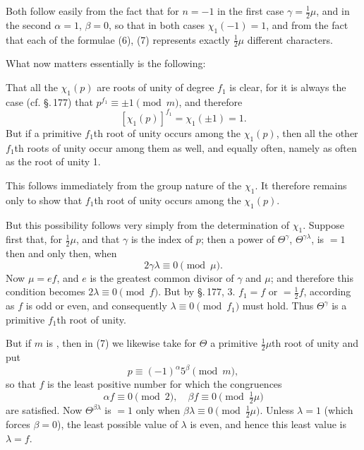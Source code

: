 Both follow easily from the fact that for $n = -1$ in the first
case $\gamma = \tfrac12\mu$, and in the second $\alpha=1$,
$\beta=0$, so that in both cases $\chi_1(-1)=1$, and from the fact
that each of the formulae (6), (7) represents exactly
$\tfrac12\mu$ different characters.

What now matters essentially is the following:

\begin{quote}
\end{quote}

That all the $\chi_1(p)$ are roots of unity of degree $f_1$ is
clear, for it is always the case (cf. \S.\,177) that
$p^{f_1}\equiv\pm1\pmod{m}$, and therefore
\[ [\chi_1(p)]^{f_1} = \chi_1(\pm1) = 1. \]
But if a primitive $f_1$th root of unity occurs among the
$\chi_1(p)$, then all the other $f_1$th roots of unity occur among
them as well, and equally often, namely as often as the root of
unity 1.

This follows immediately from the group nature of the $\chi_1$. It
therefore remains only to show that  $f_1$th root of
unity occurs among the $\chi_1(p)$.

But this possibility follows very simply from the determination of
$\chi_1$. Suppose first that, for  $\tfrac12\mu$, and that $\gamma$
is the index of $p$; then a power of $\Theta^{\gamma}$,
$\Theta^{\gamma\lambda}$, is $=1$ then and only then, when
\[ 2\gamma\lambda \equiv 0 \pmod{\mu}. \]
Now $\mu=ef$, and $e$ is the greatest common divisor of $\gamma$
and $\mu$; and therefore this condition becomes
$2\lambda\equiv0\pmod{f}$. But by \S.\,177, 3. $f_1=f$
or $=\tfrac12 f$, according as $f$ is odd or even, and
consequently $\lambda\equiv0\pmod{f_1}$ must hold. Thus
$\Theta^{\gamma}$ is a primitive $f_1$th root of unity.

But if $m$ is , then in (7) we likewise take for $\Theta$
a primitive $\tfrac12\mu$th root of unity and put
\[ p \equiv (-1)^{\alpha}5^{\beta} \pmod{m}, \]
so that $f$ is the least positive number for which the congruences
\[ \alpha f \equiv 0 \pmod{2}, \quad \beta f \equiv 0 \pmod{\tfrac12\mu} \]
are satisfied. Now $\Theta^{\beta\lambda}$ is $=1$ only when
$\beta\lambda\equiv0\pmod{\tfrac12\mu}$. Unless $\lambda=1$
(which forces $\beta=0$), the least possible value of $\lambda$ is
even, and hence this least value is $\lambda=f$.
